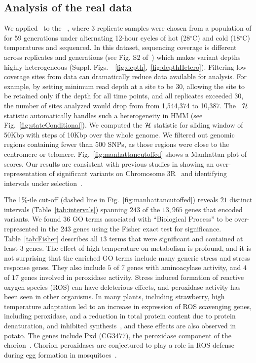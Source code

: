 \subsection{Analysis of the real data}\label{sec:dmel}
We applied \comale\ to the \data~\cite{orozco2012adaptation}, where 3 
replicate samples
were chosen from a population of \dmel for 59
generations under alternating 12-hour cycles of hot (28$^{\circ}$C)
and cold (18$^{\circ}$C) temperatures and sequenced. 
In this dataset, sequencing coverage is different across replicates and 
generations (see Fig. S2 of~\cite{Terhorst2015Multi}) which makes variant 
depths highly heterogeneous (Suppl. 
Figs.~~\ref{fig:depth},~\ref{fig:depthHetero}). Filtering low
coverage sites from data can dramatically reduce data available for
analysis. For example, by setting minimum read depth at a site to be
$30$, allowing the site to be retained only if the depth for all time
points, and all replicates exceeded $30$, the number of sites analyzed
would drop from from 1,544,374 to 10,387. The \comale\ ${\cal H}$ statistic
automatically handles such a heterogeneity in HMM (see 
Fig.~\ref{fig:stateConditional}). We computed the ${\cal H}$ statistic for 
sliding window of 50Kbp with steps
of 10Kbp over the whole genome. We filtered out genomic regions
containing fewer than $500$ SNPs, as those regions were close to the
centromere or telomere. Fig.~\ref{fig:manhattancutoffed} shows a
Manhattan plot of scores. Our results are consistent with previous
studies in showing an over-representation
of significant variants on Chromosome 3R~\cite{orozco2012adaptation} and 
identifying intervals under selection~\cite{Terhorst2015Multi}.

The 1\%-ile cut-off (dashed line in Fig.~\ref{fig:manhattancutoffed})
reveals $21$ distinct intervals (Table~\ref{tab:intervals}) spanning
$243$ of the $13,965$ genes that encoded variants. We found $36$ GO
terms associated with ``Biological Process'' to be over-represented in
the $243$ genes using the Fisher exact test for
significance. Table~\ref{tab:Fisher} describes all $13$ terms that
were significant and contained at least $3$ genes. The effect of high
temperature on metabolism is profound, and it is not surprising that
the enriched GO terms include many generic stress and stress response
genes. They also include $5$ of $7$ genes with aminoacylase activity,
and $4$ of $17$ genes involved in peroxidase activity. Stress induced
formation of reactive oxygen species (ROS) can have deleterious
effects, and peroxidase activity has been seen in other organisms. In
many plants, including strawberry, high temperature adaptation led to
an increase in expression of ROS scavenging genes, including
peroxidase, and a reduction in total protein content due to protein
denaturation, and inhibited synthesis~\cite{gulen2004effect}, and
these effects are also observed in potato. The genes include Pxd
(CG3477), the peroxidase component of the
chorion~\cite{konstandi2005enzymatic}. Chorion peroxidases are
conjectured to play a role in ROS defense during egg formation in
mosquitoes~\cite{li2006major}.


